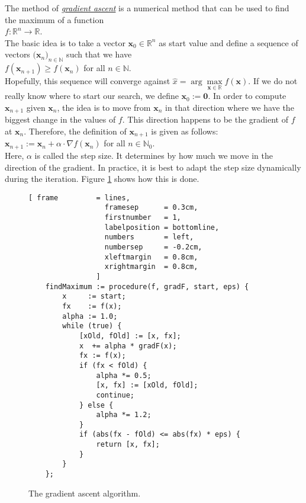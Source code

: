 The method of \href{https://en.wikipedia.org/wiki/Gradient_descent}{\emph{gradient ascent}} is a numerical
method that can be used to find the maximum of a function 
\\[0.2cm]
\hspace*{1.3cm}
$f: \mathbb{R}^n \rightarrow \mathbb{R}$.
\\[0.2cm]
The basic idea is to take a vector $\mathbf{x}_0 \in \mathbb{R}^n$ as start value and define a sequence of
vectors $\bigl(\mathbf{x}_n\bigr)_{n\in\mathbb{N}}$ such that we have
\\[0.2cm]
\hspace*{1.3cm}
$f(\mathbf{x}_{n+1}) \geq f(\mathbf{x}_{n})$ \quad for all $n\in\mathbb{N}$.
\\[0.2cm]
Hopefully, this sequence will converge against $\widehat{x} = \arg\max\limits_{\mathbf{x}\in \mathbb{R}}f(\mathbf{x})$.
If we do not really know where to start our search, we define $\mathbf{x}_0 := \mathbf{0}$.  In order to
compute $\mathbf{x}_{n+1}$ given $\mathbf{x}_{n}$, the idea is to move from $\mathbf{x}_n$ in that direction
where we have the biggest change in the values of $f$.   This direction happens to be the gradient of $f$ at $\mathbf{x}_n$.
Therefore, the definition of $\mathbf{x}_{n+1}$ is given as follows:
\\[0.2cm]
\hspace*{1.3cm}
$\mathbf{x}_{n+1} := \mathbf{x}_n + \alpha \cdot \nabla f(\mathbf{x}_n)$ \quad for all $n \in \mathbb{N}_0$.
\\[0.2cm]
Here, $\alpha$ is called the step size.  It determines by how much we move in the direction of the gradient.
In practice, it is best to adapt the step size dynamically during the iteration.  Figure
\ref{fig:gradient-ascent.stlx} shows how this is done.



\begin{figure}[!ht]
\centering
\begin{Verbatim}[ frame         = lines, 
                  framesep      = 0.3cm, 
                  firstnumber   = 1,
                  labelposition = bottomline,
                  numbers       = left,
                  numbersep     = -0.2cm,
                  xleftmargin   = 0.8cm,
                  xrightmargin  = 0.8cm,
                ]
    findMaximum := procedure(f, gradF, start, eps) {
        x     := start;
        fx    := f(x);
        alpha := 1.0;
        while (true) {
            [xOld, fOld] := [x, fx];
            x  += alpha * gradF(x);
            fx := f(x);
            if (fx < fOld) {   
                alpha *= 0.5;
                [x, fx] := [xOld, fOld];
                continue;
            } else {
                alpha *= 1.2;
            }
            if (abs(fx - fOld) <= abs(fx) * eps) {
                return [x, fx];
            } 
        }
    };
\end{Verbatim}
\vspace*{-0.3cm}
\caption{The gradient ascent algorithm.}
\label{fig:gradient-ascent.stlx}
\end{figure}

